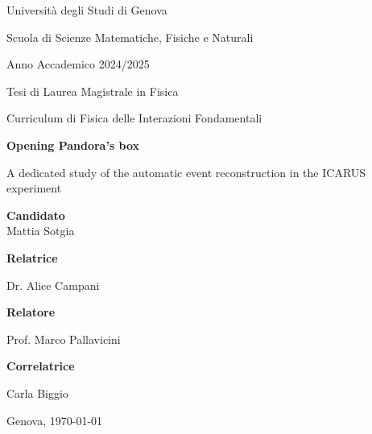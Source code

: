 \begin{titlepage}
    \ifdraft\BgThispage\fi
    \begin{center}

        {\large {Università degli Studi di Genova}}\par

        {\large  Scuola di Scienze Matematiche, Fisiche e Naturali} \par

        \vspace{0.5cm}

        {Anno Accademico 2024/2025}

        \vfill

        Tesi di Laurea Magistrale in Fisica\par
        Curriculum di Fisica delle Interazioni Fondamentali

        \vfill

        \begin{minipage}{0.775\linewidth}
            \centering
            \huge
            \bfseries
            {\LARGE Opening Pandora's box}\par%
            {\Large A dedicated study of the automatic event reconstruction in the ICARUS experiment}%
        \end{minipage}

        \vfill

        \textbf{\small Candidato}\\{Mattia Sotgia}%
%
        \vfill%

        \begin{minipage}{0.45\linewidth}%
            \textbf{\small Relatrice}\par%
            {Dr. Alice Campani}\par\vspace{1em}%
            \textbf{\small Relatore}\par%
            {Prof. Marco Pallavicini}%
        \end{minipage}%
        \hfill%
        \begin{minipage}{0.45\linewidth}
            \raggedleft
            \textbf{\small Correlatrice}\par
            {Carla Biggio}
        \end{minipage}

        \vspace{2cm}

		Genova, \today
    \end{center}
\end{titlepage}
